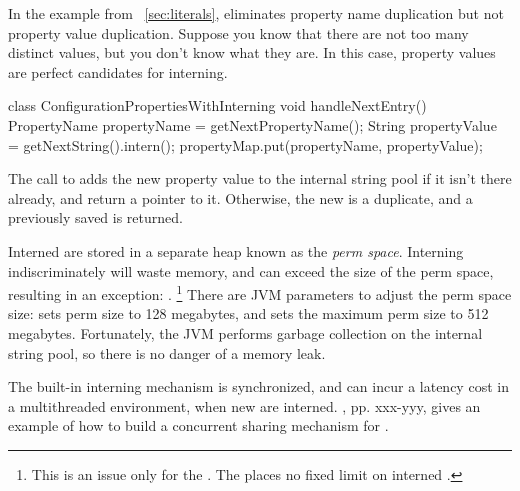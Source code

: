 In the example from ~\autoref{sec:literals},
 eliminates property
name duplication but not
property value duplication. Suppose you know that there are
not too many distinct values, but you don't know what they are. In this case,
property values are perfect candidates for interning.
\begin{shortlisting}
 
 class ConfigurationPropertiesWithInterning {
    void handleNextEntry() {
       PropertyName propertyName = getNextPropertyName(); 
       String propertyValue = getNextString().intern();
       propertyMap.put(propertyName, propertyValue);
    }
}
\end{shortlisting}

The call to  adds the new property value 
 to the internal string
pool if it isn't there already, and return a pointer to it. Otherwise, the
new  is a duplicate, and a previously saved  is
returned.

Interned  are stored in a separate heap known as the
\emph{perm space}.
Interning  indiscriminately will waste memory, and can
exceed the size of the perm space, resulting in an exception: .
\footnote{This is an issue only for the \oracle \jre. The \ibm \jre places no
fixed limit on interned .} There are JVM parameters to adjust the perm
space size:  sets perm size to 128 megabytes, and  sets the
maximum perm size to 512 megabytes. Fortunately, the JVM performs garbage collection on the
internal string pool, so there is no danger of a memory leak.

The built-in interning mechanism is synchronized, and can incur a latency cost
in a multithreaded environment, when new  are interned.
\cite{EffectiveJavaBook}, pp. xxx-yyy, gives an example of how to build a
concurrent sharing mechanism for .

